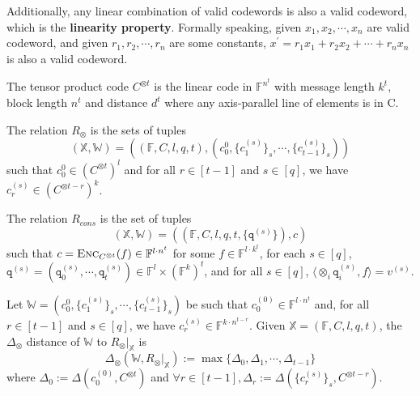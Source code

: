 Additionally, any linear combination of valid codewords is also a valid codeword, which is the \textbf{linearity property}. Formally speaking, given $x_1, x_2, \cdots, x_n$ are valid codeword, and given $r_1, r_2, \cdots, r_n$ are some constants, $x^\prime = r_1 x_1 + r_2 x_2 + \cdots + r_n x_n$ is also a valid codeword.

\begin{definition}
The tensor product code $C^{\otimes t}$ is the linear code in $\mathbb{F}^{n^t}$ with message length $k^t$, block length $n^t$ and distance $d^t$ where any axis-parallel line of elements is in C.
\end{definition}

\begin{definition}
\label{def:relation-prox}
The relation $R_\otimes$ is the sets of tuples
$$
    (\mathbb{X}, \mathbb{W}) = ((\mathbb{F}, C, l, q, t), (c_0^{0}, \{c_1^{(s)}\}_s, \cdots, \{c_{t-1}^{(s)}\}_s))
$$ 
such that $c_0^{0} \in (C^{\otimes t})^l$ and for all $r \in [t-1]$ and $s \in [q]$, we have $c_r^{(s)} \in (C^{\otimes t-r})^k$.
\end{definition}

\begin{definition}
\label{def:relation-cons}
The relation $R_{cons}$ is the set of tuples
$$
    (\mathbb{X}, \mathbb{W}) = ((\mathbb{F}, C, l, q, t, \{\texttt{q}^{(s)}\}), c)
$$ 
such that $c = \textsc{Enc}_{C^{\otimes t}}(f) \in \mathbb{F}^{l\cdot n^t}$ for some $f \in \mathbb{F}^{l\cdot k^t}$, 
for each $s \in [q]$, $\texttt{q}^{(s)} = (\texttt{q}_0^{(s)}, \cdots, \texttt{q}_t^{(s)}) \in \mathbb{F}^{l} \times (\mathbb{F}^k)^t$, 
and for all $s \in [q]$, $\langle \otimes_{i}\texttt{q}_i^{(s)} , f \rangle = v^{(s)}$.

\end{definition}

\begin{definition}
Let $\mathbb{W} = (c_0^{0}, \{c_1^{(s)}\}_s, \cdots, \{c_{t-1}^{(s)}\}_s)$ be such that $c_0^{(0)} \in \mathbb{F}^{l \cdot n^t}$ and, for all $r \in [t-1]$ and $s \in [q]$, we have $c_r^{(s)} \in \mathbb{F}^{k \cdot n^{t-r}}$. Given $\mathbb{X} = (\mathbb{F}, C, l, q, t)$, the $\Delta_\otimes$ distance of $\mathbb{W}$ to $R_\otimes|_{\mathbb{X}}$ is
$$
    \Delta_\otimes(\mathbb{W}, R_\otimes|_{\mathbb{X}}) := \max \{\Delta_0, \Delta_1, \cdots, \Delta_{t-1}\}
$$
where $\Delta_0 := \Delta(c_0^{(0)}, C^{\otimes t})$ and $\forall r \in [t-1], \Delta_r := \Delta(\{c_r^{(s)}\}_s, C^{\otimes t-r})$.
\end{definition}